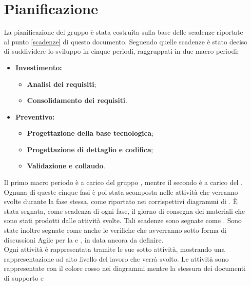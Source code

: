 \documentclass[PianoDiProgetto.tex]{subfiles}
\begin{document}
\chapter{Pianificazione}
La pianificazione del gruppo \gruppo è stata costruita sulla base delle scadenze riportate al punto \ref{scadenze} di questo documento. Seguendo quelle scadenze è stato deciso di suddividere lo sviluppo in cinque periodi, raggruppati in due macro periodi:
\begin{itemize}
	\item \textbf{Investimento:}
		\begin{itemize}
			\item \textbf{Analisi dei requisiti};
			\item \textbf{Consolidamento dei requisiti}.
		\end{itemize}
	\item \textbf{Preventivo:}
		\begin{itemize}
			\item \textbf{Progettazione della base tecnologica};
			\item \textbf{Progettazione di dettaglio e codifica};
			\item \textbf{Validazione e collaudo}.
		\end{itemize}
\end{itemize}
Il primo macro periodo è a carico del gruppo \gruppo, mentre il secondo è a carico del .\\
Ognuna di queste cinque fasi è poi stata scomposta nelle attività che verranno svolte durante la fase stessa, come riportato nei corrispettivi diagrammi di . \`{E} stata segnata, come scadenza di ogni fase, il giorno di consegna dei materiali che sono stati prodotti dalle attività svolte. Tali scadenze sono segnate come .
Sono state inoltre segnate come  anche le verifiche che avverranno sotto forma di discussioni Agile per la \tb e \pb, in data ancora da definire.\\ Ogni attività è rappresentata tramite le sue sotto attività, mostrando una rappresentazione ad alto livello del lavoro che verrà svolto.
Le attività sono rappresentate con il colore rosso nei diagrammi  mentre la stessura dei documenti di supporto e 
\newpage
\end{document}
